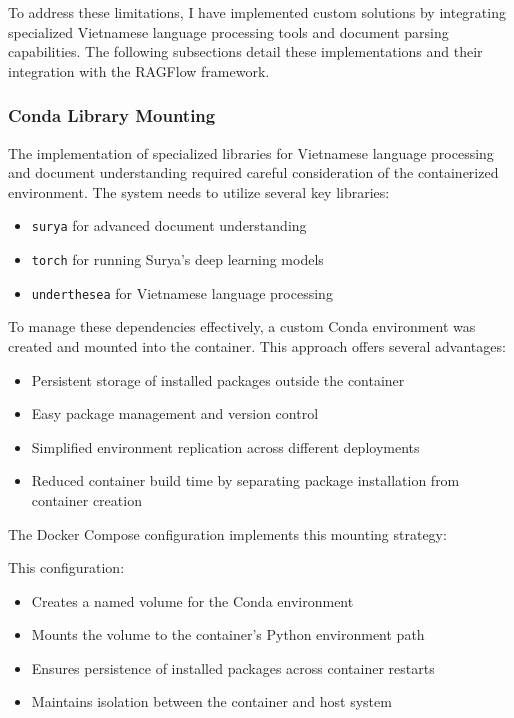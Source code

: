 \documentclass[../Main.tex]{subfiles}
\begin{document}
To address these limitations, I have implemented custom solutions by integrating specialized Vietnamese language processing tools and document parsing capabilities. The following subsections detail these implementations and their integration with the RAGFlow framework.

\subsubsection{Conda Library Mounting}
\label{section:5.1.2.1_conda_library_mounting}

The implementation of specialized libraries for Vietnamese language processing and document understanding required careful consideration of the containerized environment. The system needs to utilize several key libraries:
\begin{itemize}
    \item \texttt{surya} for advanced document understanding
    \item \texttt{torch} for running Surya's deep learning models
    \item \texttt{underthesea} for Vietnamese language processing
\end{itemize}

To manage these dependencies effectively, a custom Conda environment was created and mounted into the container. This approach offers several advantages:
\begin{itemize}
    \item Persistent storage of installed packages outside the container
    \item Easy package management and version control
    \item Simplified environment replication across different deployments
    \item Reduced container build time by separating package installation from container creation
\end{itemize}

The Docker Compose configuration implements this mounting strategy:



This configuration:
\begin{itemize}
    \item Creates a named volume for the Conda environment
    \item Mounts the volume to the container's Python environment path
    \item Ensures persistence of installed packages across container restarts
    \item Maintains isolation between the container and host system
\end{itemize}
\end{document}
